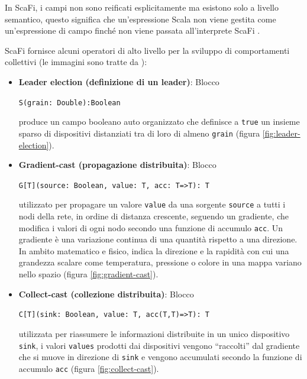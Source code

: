 \documentclass[12pt,a4paper,openright,twoside]{book}
\begin{document}
In ScaFi, i campi non sono reificati esplicitamente ma esistono solo a livello semantico, questo significa che un'espressione Scala non viene gestita come un'espressione di campo finché non viene passata all'interprete ScaFi \cite{CasadeiPhDThesis}.

ScaFi fornisce alcuni operatori di alto livello per la sviluppo di comportamenti collettivi \cite{Casadei2022} (le immagini sono tratte da \cite{CasadeiPhDThesis}):

\begin{itemize}
    \item \textbf{Leader election (definizione di un leader)}: Blocco 
    \begin{center}
        \verb|S(grain: Double):Boolean|
    \end{center}
    produce un campo booleano auto organizzato che definisce a \verb|true| un insieme sparso di dispositivi distanziati tra di loro di almeno \verb|grain| (figura \ref{fig:leader-election}).
    \item \textbf{Gradient-cast (propagazione distribuita)}: Blocco 
    \begin{center}
        \verb|G[T](source: Boolean, value: T, acc: T=>T): T|
    \end{center}
    utilizzato per propagare un valore \verb|value| da una sorgente \verb|source| a tutti i nodi della rete, in ordine di distanza crescente, seguendo un gradiente, che modifica i valori di ogni nodo secondo una funzione di accumulo \verb|acc|. Un gradiente è una variazione continua di una quantità rispetto a una direzione. In ambito matematico e fisico, indica la direzione e la rapidità con cui una grandezza scalare come temperatura, pressione o colore in una mappa variano nello spazio (figura \ref{fig:gradient-cast}).
    \item \textbf{Collect-cast (collezione distribuita)}: Blocco 
    \begin{center}
        \verb|C[T](sink: Boolean, value: T, acc(T,T)=>T): T| 
    \end{center}
    utilizzata per riassumere le informazioni distribuite in un unico dispositivo \verb|sink|, i valori \verb|values| prodotti dai dispositivi vengono ``raccolti'' dal gradiente che si muove in direzione di \verb|sink| e vengono accumulati secondo la funzione di accumulo \verb|acc| (figura \ref{fig:collect-cast}).
\end{itemize}
\end{document}
